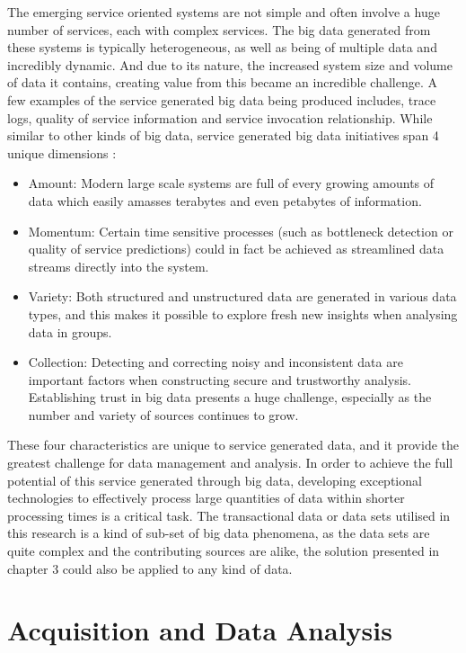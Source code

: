 The emerging service oriented systems are not simple and often involve a huge number of services, each with complex services. The big data generated from these systems is typically heterogeneous, as well as being of multiple data and incredibly dynamic. And due to its nature, the increased system size and volume of data it contains, creating value from this became an incredible challenge. A few examples of the service generated big data being produced includes, trace logs, quality of service information and service invocation relationship. While similar to other kinds of big data, service generated big data initiatives span 4 unique dimensions \cite{ecoweb}:

\begin{itemize}
\item Amount: Modern large scale systems are full of every growing amounts of data which easily amasses terabytes and even petabytes of information.
\item Momentum: Certain time sensitive processes (such as bottleneck detection or quality of service predictions) could in fact be achieved as streamlined data streams directly into the system.
\item Variety: Both structured and unstructured data are generated in various data types, and this makes it possible to explore fresh new insights when analysing data in groups.
\item Collection: Detecting and correcting noisy and inconsistent data are important factors when constructing secure and trustworthy analysis. Establishing trust in big data presents a huge challenge, especially as the number and variety of sources continues to grow.
\end{itemize}

These four characteristics are unique to service generated data, and it provide the greatest challenge for data management and analysis. In order to achieve the full potential of this service generated through big data, developing exceptional technologies to effectively process large quantities of data within shorter processing times is a critical task. The transactional data or data sets utilised in this research is a kind of sub-set of big data phenomena, as the data sets are quite complex and the contributing sources are alike, the solution presented in chapter 3 could also be applied to any kind of data. 

\section{Acquisition and Data Analysis}

